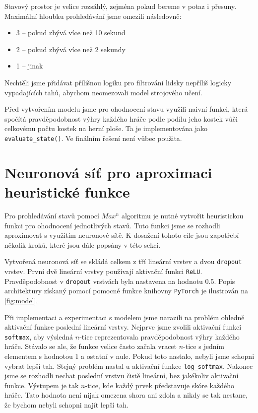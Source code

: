 \documentclass[a4paper,11pt]{article}
\begin{document}
		Stavový prostor je velice rozsáhlý, zejména pokud bereme v potaz i přesuny. Maximální hloubku prohledávání jsme omezili následovně:
		\begin{itemize}
			\item 3 -- pokud zbývá více než 10 sekund
			\item 2 -- pokud zbývá více než 2 sekundy
			\item 1 -- jinak
		\end{itemize}
	
		Nechtěli jsme přidávat přílišnou logiku pro filtrování lidsky nepříliš logicky vypadajících tahů, abychom neomezovali model strojového učení.
		
		Před vytvořením modelu jsme pro ohodnocení stavu využili naivní funkci, která spočítá pravděpodobnost výhry každého hráče podle podílu jeho kostek vůči celkovému počtu kostek na herní ploše. Ta je implementována jako \texttt{evaluate\_state()}. Ve finálním řešení není vůbec použita.
	
	\section{Neuronová síť pro aproximaci heuristické funkce}
	\label{section:nn}
		Pro prohledávání stavů pomocí \texttt{$Max^n$} algoritmu je nutné vytvořit heuristickou funkci pro ohodnocení jednotlivých stavů. Tuto funkci jsme se rozhodli aproximovat s využitím neuronové sítě. K dosažení tohoto cíle jsou zapotřebí několik kroků, které jsou dále popsány v této sekci.
		
		Vytvořená neuronová síť se skládá celkem z tří lineární vrstev a dvou \texttt{dropout} vrstev. První dvě lineární vrstvy používají aktivační funkci \texttt{ReLU}. Pravděpodobnost v \texttt{dropout} vrstvách byla nastavena na hodnotu $0.5$. Popis architektury získaný pomocí pomocné funkce knihovny \texttt{PyTorch} je ilustrován na \ref{fig:model}.
		
		Při implementaci a experimentaci s modelem jsme narazili na problém ohledně aktivační funkce poslední lineární vrstvy. Nejprve jsme zvolili aktivační funkci \texttt{softmax}, aby výsledná $n$-tice reprezentovala pravděpodobnost výhry každého hráče. Stávalo se ale, že funkce velice často začala vracet $n$-tice s jedním elementem s hodnotou $1$ a ostatní v nule. Pokud toto nastalo, nebyli jsme schopni vybrat lepší tah. Stejný problém nastal u aktivační funkce \texttt{log\_softmax}. Nakonec jsme se rozhodli nechat poslední vrstvu čistě lineární, bez jakékoliv aktivační funkce. Výstupem je tak $n$-tice, kde každý prvek představuje skóre každého hráče. Tato hodnota není nijak omezena shora ani zdola a nikdy se tak nestane, že bychom nebyli schopni najít lepší tah.
		
\end{document}
